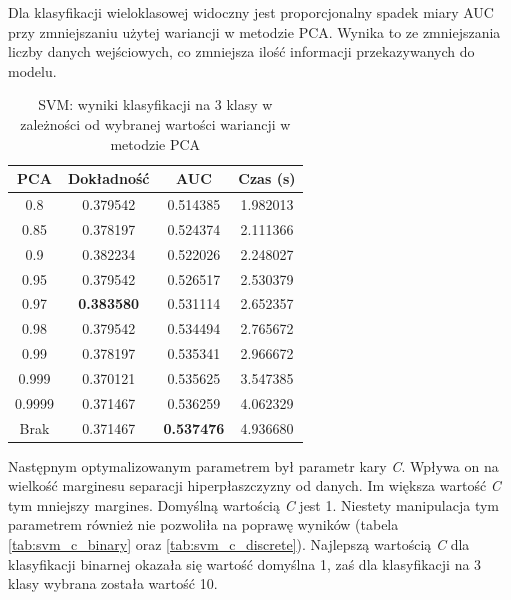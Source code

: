 \documentclass[a4paper, twoside, 11pt, openright]{article}
\begin{document}
Dla klasyfikacji wieloklasowej widoczny jest proporcjonalny spadek miary AUC przy zmniejszaniu użytej wariancji w metodzie PCA. Wynika to ze zmniejszania liczby danych wejściowych, co zmniejsza ilość informacji przekazywanych do modelu.

\begin{table}[H]
    \centering
    \begin{tabular}{|c|c|c|c|}
    \hline
        \textbf{PCA} & \textbf{Dokładność} &  \textbf{AUC} &  \textbf{Czas (s)} \\ \hline
0.8                &  0.379542 &  0.514385 &    1.982013 \\ \hline
0.85               &  0.378197 &  0.524374 &    2.111366 \\ \hline
0.9                &  0.382234 &  0.522026 &    2.248027 \\ \hline
0.95               &  0.379542 &  0.526517 &    2.530379 \\ \hline
0.97               &  \textbf{0.383580} &  0.531114 &    2.652357 \\ \hline
0.98               &  0.379542 &  0.534494 &    2.765672 \\ \hline
0.99               &  0.378197 &  0.535341 &    2.966672 \\ \hline
0.999			   &  0.370121 &  0.535625 &    3.547385 \\ \hline
0.9999             &  0.371467 &  0.536259 &    4.062329 \\ \hline
Brak                &  0.371467 &  \textbf{0.537476} &    4.936680 \\ \hline
    \end{tabular}
    \caption{SVM: wyniki klasyfikacji na 3 klasy w zależności od wybranej wartości wariancji w metodzie PCA}
    \label{tab:svm_pca_discrete}
\end{table}


Następnym optymalizowanym parametrem był parametr kary \textit{C}. Wpływa on na wielkość marginesu separacji hiperpłaszczyzny od danych. Im większa wartość \textit{C} tym mniejszy margines. Domyślną wartością \textit{C} jest 1. Niestety manipulacja tym parametrem również nie pozwoliła na poprawę wyników (tabela \ref{tab:svm_c_binary} oraz \ref{tab:svm_c_discrete}). Najlepszą wartością \textit{C} dla klasyfikacji binarnej okazała się wartość domyślna 1, zaś dla klasyfikacji na 3 klasy wybrana została wartość 10. 
\end{document}
